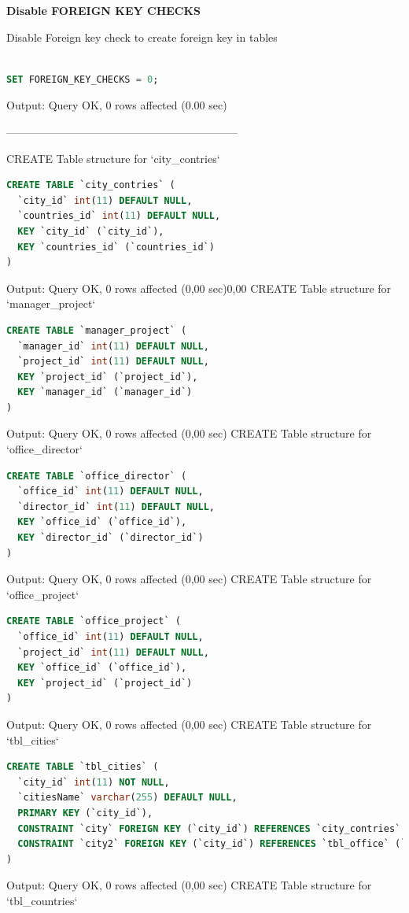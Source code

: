 \documentclass[12pt]{report}
\begin{document}
\textbf {Disable FOREIGN KEY CHECKS}

Disable Foreign key check to create foreign key in tables
 
\begin{lstlisting}[language=sql]

SET FOREIGN_KEY_CHECKS = 0;

\end{lstlisting}
Output: Query OK, 0 rows affected (0.00 sec)

---------------------------------------------------------------



CREATE Table structure for `city\_contries`

\begin{lstlisting}[language=sql]
CREATE TABLE `city_contries` (
  `city_id` int(11) DEFAULT NULL,
  `countries_id` int(11) DEFAULT NULL,
  KEY `city_id` (`city_id`),
  KEY `countries_id` (`countries_id`)
)
\end{lstlisting}
Output: Query OK, 0 rows affected (0,00 sec)0,00
CREATE Table structure for `manager\_project`

\begin{lstlisting}[language=sql]
CREATE TABLE `manager_project` (
  `manager_id` int(11) DEFAULT NULL,
  `project_id` int(11) DEFAULT NULL,
  KEY `project_id` (`project_id`),
  KEY `manager_id` (`manager_id`)
)
\end{lstlisting}
Output: Query OK, 0 rows affected (0,00 sec)
CREATE Table structure for `office\_director`

\begin{lstlisting}[language=sql]
CREATE TABLE `office_director` (
  `office_id` int(11) DEFAULT NULL,
  `director_id` int(11) DEFAULT NULL,
  KEY `office_id` (`office_id`),
  KEY `director_id` (`director_id`)
)
\end{lstlisting}
Output: Query OK, 0 rows affected (0,00 sec)
CREATE Table structure for `office\_project`

\begin{lstlisting}[language=sql]
CREATE TABLE `office_project` (
  `office_id` int(11) DEFAULT NULL,
  `project_id` int(11) DEFAULT NULL,
  KEY `office_id` (`office_id`),
  KEY `project_id` (`project_id`)
)
\end{lstlisting}
Output: Query OK, 0 rows affected (0,00 sec)
CREATE Table structure for `tbl\_cities`

\begin{lstlisting}[language=sql]
CREATE TABLE `tbl_cities` (
  `city_id` int(11) NOT NULL,
  `citiesName` varchar(255) DEFAULT NULL,
  PRIMARY KEY (`city_id`),
  CONSTRAINT `city` FOREIGN KEY (`city_id`) REFERENCES `city_contries` (`city_id`) ON DELETE CASCADE ON UPDATE CASCADE,
  CONSTRAINT `city2` FOREIGN KEY (`city_id`) REFERENCES `tbl_office` (`citi_id`) ON DELETE CASCADE ON UPDATE CASCADE
)
\end{lstlisting}
Output: Query OK, 0 rows affected (0,00 sec)
CREATE Table structure for `tbl\_countries`
\end{document}
